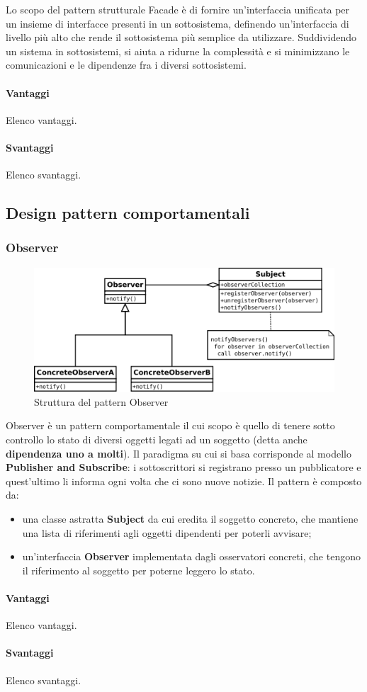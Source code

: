 \documentclass[../SpecificaTecnica.tex]{subfiles}
\begin{document}
\begin{appendices}
			Lo scopo del pattern strutturale Facade è di fornire un'interfaccia unificata per un insieme di interfacce presenti in un sottosistema, definendo un'interfaccia di livello più alto che rende il sottosistema più semplice da utilizzare. Suddividendo un sistema in sottosistemi, si aiuta a ridurne la complessità e si minimizzano le comunicazioni e le dipendenze fra i diversi sottosistemi.
			\paragraph{Vantaggi}
				Elenco vantaggi.
			\paragraph{Svantaggi}
				Elenco svantaggi.
	\subsection{Design pattern comportamentali}
		\subsubsection{Observer}
			\begin{figure}[!h]
				\centering
				\includegraphics[scale=0.7]{pattern/observer}
				\caption{Struttura del pattern Observer}
				\label{fig:Struttura_Observer}
			\end{figure}
			Observer è un pattern comportamentale il cui scopo è quello di tenere sotto controllo lo stato di diversi oggetti legati ad un soggetto (detta anche \textbf{dipendenza uno a molti}). Il paradigma su cui si basa corrisponde al modello \textbf{Publisher and Subscribe}: i sottoscrittori si registrano presso un pubblicatore e quest'ultimo li informa ogni volta che ci sono nuove notizie. Il pattern è composto da:
				\begin{itemize}
					\item una classe astratta \textbf{Subject} da cui eredita il soggetto concreto, che mantiene una lista di riferimenti agli oggetti dipendenti per poterli avvisare;
					\item un'interfaccia \textbf{Observer} implementata dagli osservatori concreti, che tengono il riferimento al soggetto per poterne leggero lo stato.
				\end{itemize}
			\paragraph{Vantaggi}
				Elenco vantaggi.
			\paragraph{Svantaggi}
				Elenco svantaggi.
				
\end{appendices}
\end{document}
